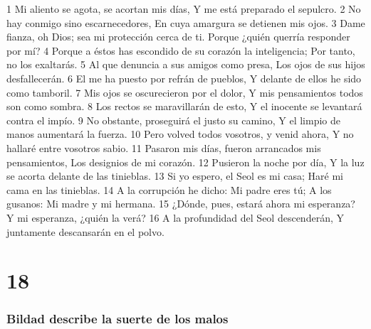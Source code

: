 1 Mi aliento se agota, se acortan mis días,  
Y me está preparado el sepulcro.  
2 No hay conmigo sino escarnecedores,  
En cuya amargura se detienen mis ojos.  
3 Dame fianza, oh Dios; sea mi protección cerca de ti.  
Porque ¿quién querría responder por mí?  
4 Porque a éstos has escondido de su corazón la inteligencia;  
Por tanto, no los exaltarás.  
5 Al que denuncia a sus amigos como presa,  
Los ojos de sus hijos desfallecerán.  
6 El me ha puesto por refrán de pueblos,  
Y delante de ellos he sido como tamboril.  
7 Mis ojos se oscurecieron por el dolor,  
Y mis pensamientos todos son como sombra.  
8 Los rectos se maravillarán de esto,  
Y el inocente se levantará contra el impío.  
9 No obstante, proseguirá el justo su camino,  
Y el limpio de manos aumentará la fuerza.  
10 Pero volved todos vosotros, y venid ahora,  
Y no hallaré entre vosotros sabio.  
11 Pasaron mis días, fueron arrancados mis pensamientos,  
Los designios de mi corazón.  
12 Pusieron la noche por día,  
Y la luz se acorta delante de las tinieblas.  
13 Si yo espero, el Seol es mi casa;  
Haré mi cama en las tinieblas.  
14 A la corrupción he dicho: Mi padre eres tú;  
A los gusanos: Mi madre y mi hermana.  
15 ¿Dónde, pues, estará ahora mi esperanza?  
Y mi esperanza, ¿quién la verá?  
16 A la profundidad del Seol descenderán,  
Y juntamente descansarán en el polvo. 

\chapter{18}

\subsection*{Bildad describe la suerte de los malos}  

